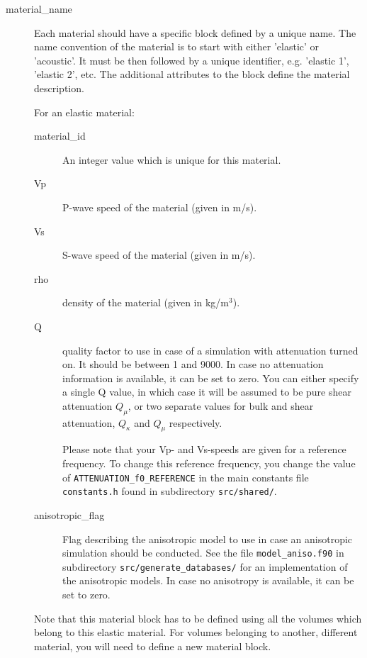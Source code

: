 \begin{description}
\item [{material\_name}] Each material should have a specific block defined
by a unique name. The name convention of the material is to start
with either 'elastic' or 'acoustic'. It must be then followed by a
unique identifier, e.g. 'elastic 1', 'elastic 2', etc. The additional
attributes to the block define the material description.


For an elastic material:
\begin{description}
\item [{material\_id}] An integer value which is unique for this material.
\item [{Vp}] P-wave speed of the material (given in m/s).
\item [{Vs}] S-wave speed of the material (given in m/s).
\item [{rho}] density of the material (given in kg/m$^{3}$).
\item [{Q}] quality factor to use in case of a simulation with attenuation
turned on. It should be between 1 and 9000. In case no attenuation
information is available, it can be set to zero. You can either specify a single Q value,
in which case it will be assumed to be pure shear attenuation $Q_{\mu}$, or two
separate values for bulk and shear attenuation, $Q_{\kappa}$ and $Q_{\mu}$ respectively.

Please note that your Vp- and Vs-speeds are given for a reference frequency. To change
this reference frequency, you change the value of \texttt{ATTENUATION\_f0\_REFERENCE}
in the main constants file \texttt{constants.h} found in subdirectory
\texttt{src/shared/}.
\item [{anisotropic\_flag}] Flag describing the anisotropic model to use
in case an anisotropic simulation should be conducted. See the file
\texttt{model\_aniso.f90} in subdirectory \texttt{src/generate\_databases/}
for an implementation of the anisotropic models. In case no anisotropy
is available, it can be set to zero.
\end{description}

Note that this material block has to be defined using all the volumes
which belong to this elastic material. For volumes belonging to another,
different material, you will need to define a new material block.



\end{description}
